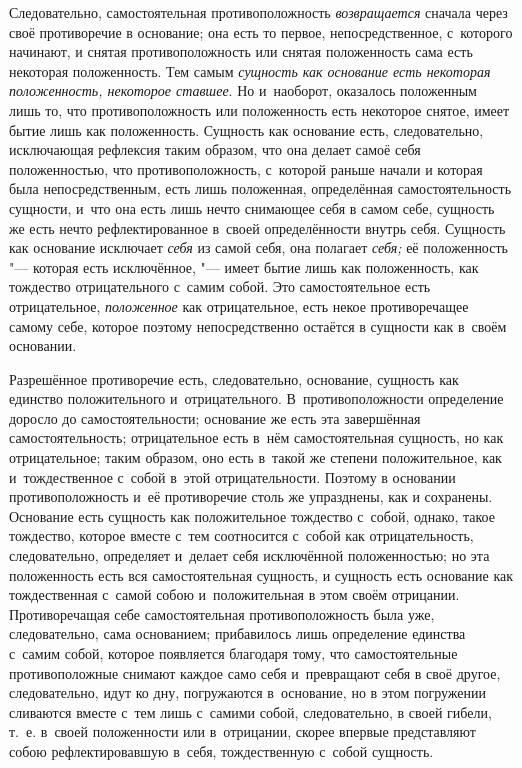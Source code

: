 Следовательно, самостоятельная противоположность
{\em возвращается} сначала через своё противоречие в
основание; она есть то первое, непосредственное, с~которого начинают, и
снятая противоположность или снятая положенность сама есть некоторая
положенность. Тем самым {\em сущность как основание
есть некоторая положенность, некоторое ставшее}. Но и~наоборот, оказалось
положенным лишь то, что противоположность или положенность есть некоторое
снятое, имеет бытие лишь как положенность. Сущность как основание есть,
следовательно, исключающая рефлексия таким образом, что она делает самоё
себя положенностью, что противоположность, с~которой раньше начали и
которая была непосредственным, есть лишь положенная, определённая
самостоятельность сущности, и~что она есть лишь нечто снимающее себя в
самом себе, сущность же есть нечто рефлектированное в~своей определённости
внутрь себя. Сущность как основание исключает
{\em себя} из самой себя, она полагает
{\em себя;} её положенность "--- которая есть исключённое,
"--- имеет бытие лишь как положенность, как тождество отрицательного с~самим
собой. Это самостоятельное есть отрицательное,
{\em положенное} как отрицательное, есть некое
противоречащее самому себе, которое поэтому непосредственно остаётся в
сущности как в~своём основании.

Разрешённое противоречие есть, следовательно, основание, сущность как
единство положительного и~отрицательного. В~противоположности определение
доросло до самостоятельности; основание же есть эта завершённая
самостоятельность; отрицательное есть в~нём самостоятельная сущность, но
как отрицательное; таким образом, оно есть в~такой же степени
положительное, как и~тождественное с~собой в~этой отрицательности. Поэтому
в основании противоположность и~её противоречие столь же упразднены, как и
сохранены. Основание есть сущность как положительное тождество с~собой,
однако, такое тождество, которое вместе с~тем соотносится с~собой как
отрицательность, следовательно, определяет и~делает себя исключённой
положенностью; но эта положенность есть вся самостоятельная сущность, и
сущность есть основание как тождественная с~самой собою и~положительная в
этом своём отрицании. Противоречащая себе самостоятельная противоположность
была уже, следовательно, сама основанием; прибавилось лишь определение
единства с~самим собой, которое появляется благодаря тому, что
самостоятельные противоположные снимают каждое само себя и~превращают себя
в своё другое, следовательно, идут ко дну, погружаются в~основание, но в
этом погружении сливаются вместе с~тем лишь с~самими собой, следовательно,
в своей гибели, т.~е. в~своей положенности или в~отрицании, скорее впервые
представляют собою рефлектировавшую в~себя, тождественную с~собой сущность.

